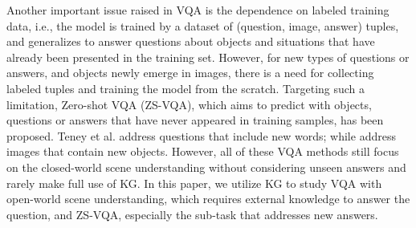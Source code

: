 \documentclass[runningheads]{llncs}
\newcommand{\gyx}[1]{{\color{black}#1}}
\newcommand{\cjy}[1]{{\color{black}#1}}
\begin{document}
\gyx{Another important \cjy{issue} raised in VQA is the dependence on labeled training data, i.e., the model is trained by a dataset of (question, image, answer) tuples, and generalizes to answer questions about objects and situations that have already been presented in the training set.
However, for new types of questions or answers, and objects newly \cjy{emerge} in images, there is a need for collecting labeled tuples and training the model from the scratch.
Targeting such a limitation, \cjy{Zero-shot VQA (ZS-VQA), which aims to predict with objects, questions or answers that have never appeared in training samples, has been proposed.
Teney et al. \cite{DBLP:journals/corr/TeneyH16a} address questions that include new words; while \cite{DBLP:conf/cvpr/RamakrishnanPSM17,DBLP:journals/ivc/FaraziKB20} address images that contain new objects.}
However, all of these VQA methods still focus on the closed-world scene understanding without considering unseen answers and rarely make full use of KG.
\cjy{In this paper, we utilize KG to study VQA with open-world scene understanding, which requires external knowledge to answer the question, and ZS-VQA, especially the sub-task that addresses new answers}.}
\end{document}
